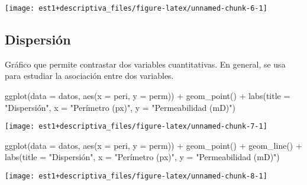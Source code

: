 \documentclass[
]{book}
\newenvironment{Shaded}{\begin{snugshade}}{\end{snugshade}}
\newcommand{\AttributeTok}[1]{\textcolor[rgb]{0.77,0.63,0.00}{#1}}
\newcommand{\FunctionTok}[1]{\textcolor[rgb]{0.00,0.00,0.00}{#1}}
\newcommand{\NormalTok}[1]{#1}
\newcommand{\SpecialCharTok}[1]{\textcolor[rgb]{0.00,0.00,0.00}{#1}}
\newcommand{\StringTok}[1]{\textcolor[rgb]{0.31,0.60,0.02}{#1}}
\begin{document}
\begin{center}\texttt{[image: est1+descriptiva\_files/figure-latex/unnamed-chunk-6-1]} \end{center}

\hypertarget{dispersiuxf3n}{%
\subsection{Dispersión}\label{dispersiuxf3n}}

Gráfico que permite contrastar dos variables cuantitativas. En general, se usa para estudiar la asociación entre dos variables.

\begin{Shaded}
\begin{Highlighting}[]
\FunctionTok{ggplot}\NormalTok{(}\AttributeTok{data =}\NormalTok{ datos, }\FunctionTok{aes}\NormalTok{(}\AttributeTok{x =}\NormalTok{ peri, }\AttributeTok{y =}\NormalTok{ perm)) }\SpecialCharTok{+}
  \FunctionTok{geom\_point}\NormalTok{() }\SpecialCharTok{+}
  \FunctionTok{labs}\NormalTok{(}\AttributeTok{title =} \StringTok{"Dispersión"}\NormalTok{, }\AttributeTok{x =} \StringTok{"Perímetro (px)"}\NormalTok{, }\AttributeTok{y =} \StringTok{"Permeabilidad (mD)"}\NormalTok{)}
\end{Highlighting}
\end{Shaded}

\begin{center}\texttt{[image: est1+descriptiva\_files/figure-latex/unnamed-chunk-7-1]} \end{center}

\begin{Shaded}
\begin{Highlighting}[]
\FunctionTok{ggplot}\NormalTok{(}\AttributeTok{data =}\NormalTok{ datos, }\FunctionTok{aes}\NormalTok{(}\AttributeTok{x =}\NormalTok{ peri, }\AttributeTok{y =}\NormalTok{ perm)) }\SpecialCharTok{+} 
  \FunctionTok{geom\_point}\NormalTok{() }\SpecialCharTok{+} 
  \FunctionTok{geom\_line}\NormalTok{() }\SpecialCharTok{+}
  \FunctionTok{labs}\NormalTok{(}\AttributeTok{title =} \StringTok{"Dispersión"}\NormalTok{, }\AttributeTok{x =} \StringTok{"Perímetro (px)"}\NormalTok{, }\AttributeTok{y =} \StringTok{"Permeabilidad (mD)"}\NormalTok{)}
\end{Highlighting}
\end{Shaded}

\begin{center}\texttt{[image: est1+descriptiva\_files/figure-latex/unnamed-chunk-8-1]} \end{center}
\end{document}
